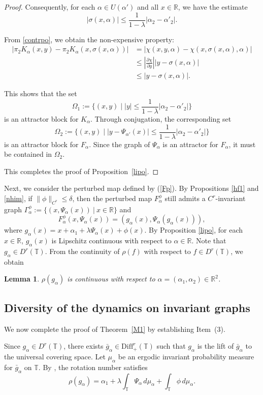 \documentclass{amsart}
\newcommand{\R}{\mathbb{R}}
\newcommand{\al}{\alpha}
\newcommand{\T}{\mathbb{T}}
\newtheorem{Lemma}[Definition]{Lemma}
\theoremstyle{definition}
\begin{document}
\begin{proof}
Consequently, for each $\alpha \in U(\alpha')$ and all $x \in \R$, we have the estimate
\[
|\sigma(x, \alpha)| \leq \frac{1}{1-\lambda}|\alpha_2 - \alpha'_2|.
\]


From \eqref{contrpo}, we obtain the non-expensive property:
\begin{align*}
|\pi_2 K_\alpha(x,y) - \pi_2 K_\alpha(x, \sigma(x, \alpha))|
&= |\chi(x,y,\alpha) - \chi(x, \sigma(x, \alpha), \alpha)| \\
&\leq \left|\frac{\partial \chi}{\partial y}\right| |y - \sigma(x, \alpha)| \\
&\leq |y - \sigma(x, \alpha)|.
\end{align*}

This shows that the set
\[
\Omega_1 := \{(x,y) \mid |y| \leq \frac{1}{1-\lambda}|\alpha_2 - \alpha'_2|\}
\]
is an attractor block for $K_\alpha$. Through conjugation, the corresponding set
\[
\Omega_2 := \{(x,y) \mid |y - \Psi_{\alpha'}(x)| \leq \frac{1}{1-\lambda}|\alpha_2 - \alpha'_2|\}
\]
is an attractor block for $F_\alpha$. Since the graph of $\Psi_\alpha$ is an attractor for $F_\alpha$, it must be contained in $\Omega_2$.

This completes the proof of Proposition~\ref{lipo}.
\end{proof}



Next, we consider the perturbed map defined by (\ref{Fp}). By Propositions \ref{hf1} and \ref{nhim}, if $\|\phi\|_{C^r}\leq \delta$, then the perturbed map $F^{\phi}_\alpha$ still admits a $C^r$-invariant graph ${\Gamma}_\alpha^\phi:=\{(x,{\Psi}_{\alpha}(x))\ |\ x\in \R\}$ and
\[F^{\phi}_\alpha(x,{\Psi}_{\alpha}(x))=(g_\al(x),{\Psi}_{\alpha}(g_\al(x))),\]
where $g_\al(x)=x+\al_1+\lambda{\Psi}_{\alpha}(x)+\phi(x)$. By Proposition \ref{lipo}, for each $x\in \R$, $g_\al(x)$ is Lipschitz continuous  with respect to $\al\in \R$.  Note that $g_\al\in D^r(\T)$. From the continuity of $\rho(f)$ with respect to $f\in D^r(\T)$, we obtain
\begin{Lemma}\label{contt}
$\rho(g_\al)$ is continuous with respect to $\al=(\al_1,\al_2)\in \R^2$.
\end{Lemma}


\subsection{Diversity of the dynamics on invariant graphs}
We now complete the proof of Theorem~\ref{M1} by establishing Item~(3).

Since $g_\alpha \in D^r(\T)$, there exists $\bar{g}_\alpha \in \mathrm{Diff}^r_+(\T)$ such that $g_\alpha$ is the lift of $\bar{g}_\alpha$ to the universal covering space. Let $\mu_\alpha$ be an ergodic invariant probability measure for $\bar{g}_\alpha$ on $\T$. By \cite[Proposition 2.3]{H11}, the rotation number satisfies
\begin{equation}\label{rotation}
\rho(g_\alpha) = \alpha_1 + \lambda \int_{\T} \Psi_\alpha \, d\mu_\alpha+\int_{\T} \phi \, d\mu_\alpha.
\end{equation}
\end{document}
